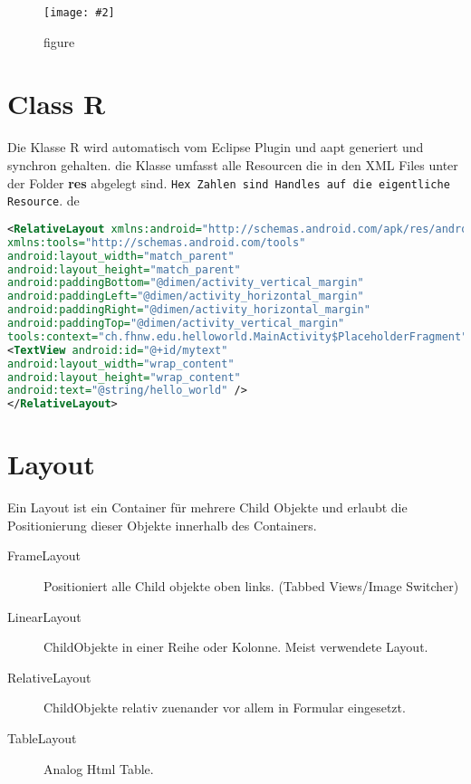\documentclass[a4paper,10pt,titlepage=false]{scrreprt}
\newcommand{\pic}[2][figure]{\begin{figure}[h]
 \centering
 \texttt{[image: \#2]}
 \caption{#1}
\end{figure}
}
\begin{document}
\pic{vklass.png}	

\section{Class R}
Die Klasse R wird automatisch vom Eclipse Plugin und aapt generiert und synchron gehalten. die Klasse umfasst alle Resourcen die in den XML Files unter der Folder \textbf{res} abgelegt sind. \texttt{Hex Zahlen sind Handles auf die eigentliche Resource}. de

\begin{lstlisting}[caption=R Class Example, language=xml]
<RelativeLayout xmlns:android="http://schemas.android.com/apk/res/android"
xmlns:tools="http://schemas.android.com/tools"
android:layout_width="match_parent"
android:layout_height="match_parent"
android:paddingBottom="@dimen/activity_vertical_margin"
android:paddingLeft="@dimen/activity_horizontal_margin"
android:paddingRight="@dimen/activity_horizontal_margin"
android:paddingTop="@dimen/activity_vertical_margin"
tools:context="ch.fhnw.edu.helloworld.MainActivity$PlaceholderFragment" >
<TextView android:id="@+id/mytext"
android:layout_width="wrap_content"
android:layout_height="wrap_content"
android:text="@string/hello_world" />
</RelativeLayout>

\end{lstlisting}

\section{Layout}
Ein Layout ist ein Container für mehrere Child Objekte und erlaubt die Positionierung dieser Objekte innerhalb des Containers.
\begin{description}
	\item[FrameLayout] Positioniert alle Child objekte oben links. (Tabbed Views/Image Switcher)
	\item[LinearLayout] ChildObjekte in einer Reihe oder Kolonne. Meist verwendete Layout.
	\item [RelativeLayout] ChildObjekte relativ zuenander vor allem in Formular eingesetzt.
	\item [TableLayout] Analog Html Table.
\end{description}
\end{document}
